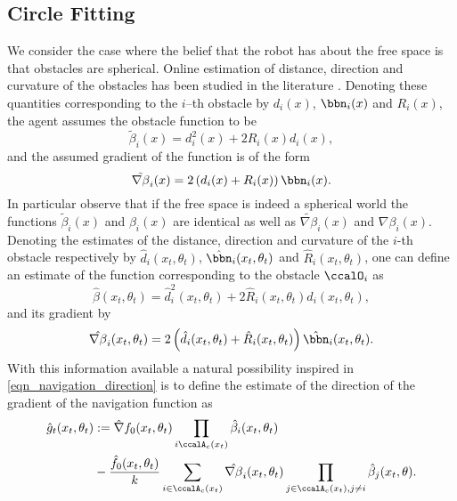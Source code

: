 \documentclass[article]{IEEEtran}
\theoremstyle{definition}
\begin{document}
\subsection{Circle Fitting}\label{sec_circles}
We consider the case where the belief that the robot has about the free space is that obstacles are spherical. Online estimation of distance, direction and curvature of the obstacles has been studied in the literature \cite{paper:de_wall_following_2013}. Denoting these quantities corresponding to the $i$--th obstacle by $d_i(x)$, $\bbn_i(x)$ and $R_i(x)$, the agent assumes the obstacle function to be
%
\begin{equation}
\tilde{\beta}_i(x)=d_i^2(x)+ 2R_i(x)d_i(x),
\end{equation}
and the assumed gradient of the function is of the form
%
\begin{equation}
\tilde{\nabla\beta}_i(x) = 2\left(d_i(x)+R_i(x)\right)\bbn_i(x).
\end{equation}
%
In particular observe that if the free space is indeed a spherical world the functions $\tilde{\beta}_i(x)$ and $\beta_i(x)$ are identical as well as $\tilde{\nabla\beta}_i(x)$ and $\nabla \beta_i(x)$. Denoting the estimates of the distance, direction and curvature of the $i$-th obstacle respectively by $\hat{d}_i(x_t,\theta_t)$, $\hat{\bbn}_i(x_t,\theta_t)$ and $\hat{R}_i(x_t,\theta_t)$, one can define an estimate of the function corresponding to the obstacle $\ccalO_i$ as 
%
\begin{equation}
\hat{\beta}(x_t,\theta_t) = \hat{d}_i^2(x_t,\theta_t) +2\hat{R}_i(x_t,\theta_t)\hat{d}_i(x_t,\theta_t),
\end{equation} 
%
and its gradient by
\begin{equation}
\hat{\nabla \beta}_i(x_t,\theta_t) =2 \left(\hat{d}_i(x_t,\theta_t) +\hat{R}_i(x_t,\theta_t)\right)\hat{\bbn}_i(x_t,\theta_t).
\end{equation}
%
With this information available a natural possibility inspired in \eqref{eqn_navigation_direction} is to define the estimate of the direction of the gradient of the navigation function as 
%
\begin{equation}\label{eqn_estimate_navigation_direction}
\begin{split}
\hat{g}_t(x_t,\theta_t) &:= \hat{\nabla}f_0(x_t,\theta_t)\prod_{i\ccalA_c(x_t)}\hat{\beta}_i(x_t,\theta_t)\\
&- \frac{\hat{f}_0(x_t,\theta_t)}{k}\sum_{i\in\ccalA_c(x_t)} \hat{\nabla\beta}_i(x_t,\theta_t)\prod_{j\in\ccalA_c(x_t), j\neq i} \hat{\beta}_j(x_t,\theta).
\end{split}
\end{equation}
\end{document}
